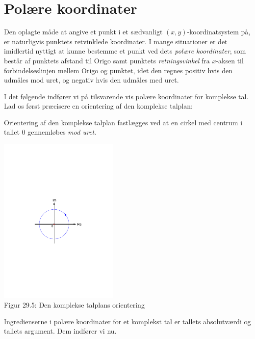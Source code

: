 \section{Polære koordinater}
Den oplagte måde at angive et punkt i et sædvanligt
$(x,y)$-koordinatsystem på, er naturligvis punktets retvinklede koordinater. I mange situationer er det imidlertid nyttigt at kunne bestemme et punkt ved dets \textit{polære koordinater}, som består af punktets afstand til Origo samt punktets \textit{retningsvinkel} fra $x$-aksen til forbindelseslinjen mellem Origo og punktet, idet den regnes positiv hvis den udmåles mod uret, og negativ hvis den udmåles med uret.\bs

I det følgende indfører vi på tilsvarende vis polære koordinater for komplekse tal. Lad os først præcisere en orientering af den komplekse talplan:

\begin{definition}
Orientering af den komplekse talplan fastlægges ved at en cirkel med centrum i tallet $0$ gennemløbes \textit{mod uret}.
\begin{center}
	\includegraphics[trim=3cm 10.8cm 3cm 10.6cm,width=0.44\textwidth,clip]{Geometer/orientering.pdf}\\
Figur 29.5: Den komplekse talplans orientering		
\end{center}
\end{definition}

Ingredienserne i polære koordinater for et komplekst tal er tallets absolutværdi og tallets argument. Dem indfører vi nu.

